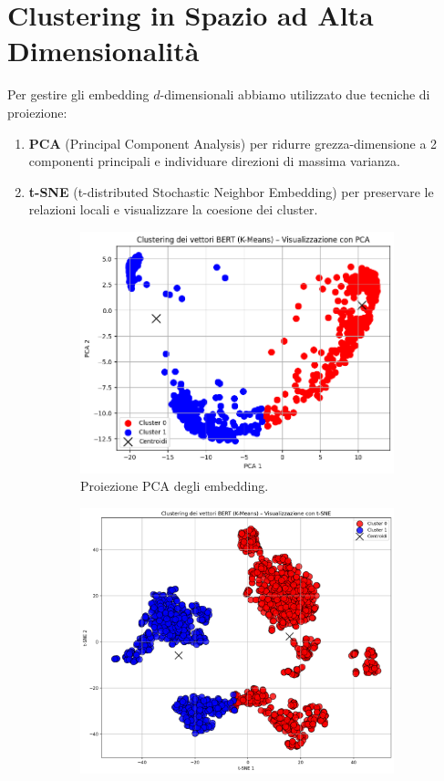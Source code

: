 \documentclass[a4paper,11pt]{article}
\begin{document}
\section{Clustering in Spazio ad Alta Dimensionalità}
Per gestire gli embedding \(d\)-dimensionali abbiamo utilizzato due tecniche di proiezione:
\begin{enumerate}
  \item \textbf{PCA} (Principal Component Analysis) per ridurre grezza-dimensione a 2 componenti principali e individuare direzioni di massima varianza.
  \item \textbf{t-SNE} (t-distributed Stochastic Neighbor Embedding) per preservare le relazioni locali e visualizzare la coesione dei cluster.
\end{enumerate}

\begin{figure}[H]
  \centering
  \begin{subfigure}[b]{0.48\textwidth}
    \includegraphics[width=\textwidth]{2.png}
    \caption{Proiezione PCA degli embedding.}
  \end{subfigure}
  \hfill
  \begin{subfigure}[b]{0.48\textwidth}
    \includegraphics[width=\textwidth]{3.png}

\end{subfigure}
\end{figure}
\end{document}
